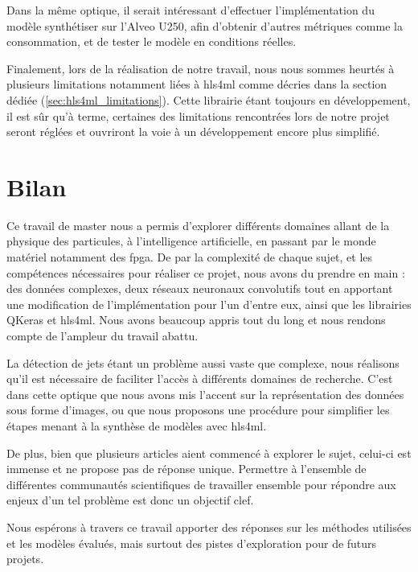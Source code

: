 Dans la même optique, il serait intéressant d'effectuer l'implémentation du modèle synthétiser sur l'Alveo U250, afin d'obtenir d'autres métriques comme la consommation, et de tester le modèle en conditions réelles.

Finalement, lors de la réalisation de notre travail, nous nous sommes heurtés à plusieurs limitations notamment liées à \acrshort{hls4ml} comme décries dans la section dédiée (\ref{sec:hls4ml_limitations}). Cette librairie étant toujours en développement, il est sûr qu'à terme, certaines des limitations rencontrées lors de notre projet seront réglées et ouvriront la voie à un développement encore plus simplifié.

\section{Bilan}

Ce travail de master nous a permis d'explorer différents domaines allant de la physique des particules, à l'intelligence artificielle, en passant par le monde matériel notamment des \acrshort{fpga}. De par la complexité de chaque sujet, et les compétences nécessaires pour réaliser ce projet, nous avons du prendre en main : des données complexes, deux réseaux neuronaux convolutifs tout en apportant une modification de l'implémentation pour l'un d'entre eux, ainsi que les librairies QKeras et \acrshort{hls4ml}.
Nous avons beaucoup appris tout du long et nous rendons compte de l'ampleur du travail abattu.

La détection de jets étant un problème aussi vaste que complexe, nous réalisons qu'il est nécessaire de faciliter l'accès à différents domaines de recherche. C'est dans cette optique que nous avons mis l'accent sur la représentation des données sous forme d'images, ou que nous proposons une procédure pour simplifier les étapes menant à la synthèse de modèles avec \acrshort{hls4ml}.

De plus, bien que plusieurs articles aient commencé à explorer le sujet, celui-ci est immense et ne propose pas de réponse unique. Permettre à l'ensemble de différentes communautés scientifiques de travailler ensemble pour répondre aux enjeux d'un tel problème est donc un objectif clef.

Nous espérons à travers ce travail apporter des réponses sur les méthodes utilisées et les modèles évalués, mais surtout des pistes d'exploration pour de futurs projets.
